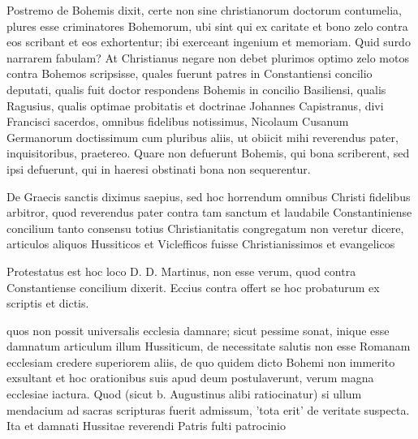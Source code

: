 Postremo de Bohemis dixit, certe non sine christianorum doctorum contumelia, plures esse criminatores Bohemorum, ubi sint qui ex caritate et bono zelo contra eos scribant et eos exhortentur; ibi exerceant ingenium et memoriam. Quid surdo narrarem fabulam? At Christianus negare non debet plurimos optimo zelo motos contra Bohemos scripsisse, quales fuerunt patres in Constantiensi concilio deputati, qualis fuit doctor respondens Bohemis in concilio Basiliensi, qualis Ragusius, qualis optimae probitatis et doctrinae Johannes Capistranus, divi Francisci sacerdos, omnibus fidelibus notissimus, Nicolaum Cusanum Germanorum doctissimum cum pluribus aliis, ut obiicit mihi reverendus pater, inquisitoribus, praetereo. Quare non defuerunt Bohemis, qui bona scriberent, sed ipsi defuerunt, qui in haeresi obstinati bona non sequerentur.

De Graecis sanctis diximus saepius, sed hoc horrendum omnibus Christi fidelibus arbitror, quod reverendus pater contra tam sanctum et laudabile Constantiniense concilium tanto consensu totius Christianitatis congregatum non veretur dicere, articulos aliquos Hussiticos et Viclefficos fuisse Christianissimos et evangelicos

Protestatus est hoc loco D. D. Martinus, non esse verum, quod contra Constantiense concilium dixerit. Eccius contra offert se hoc probaturum ex scriptis et dictis.

quos non possit universalis ecclesia damnare; sicut pessime sonat, inique esse damnatum articulum illum Hussiticum, de necessitate salutis non esse Romanam ecclesiam credere superiorem aliis, de quo quidem dicto Bohemi non immerito exsultant et hoc orationibus suis apud deum postulaverunt, verum magna ecclesiae iactura. Quod (sicut b. Augustinus alibi ratiocinatur) si ullum mendacium ad sacras scripturas fuerit admissum, 'tota erit' de veritate suspecta. Ita et damnati Hussitae reverendi Patris fulti patrocinio

